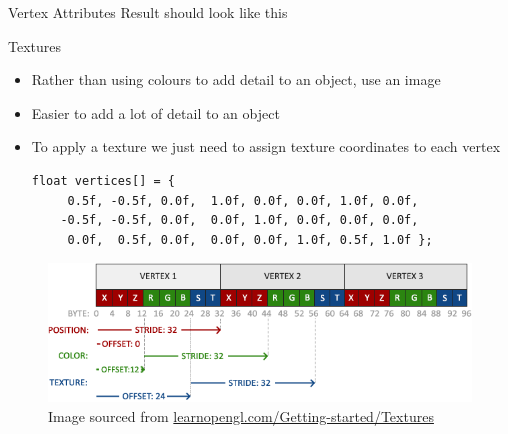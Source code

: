 \documentclass{beamer}
\begin{document}
\begin{frame}[fragile]{Vertex Attributes}
    Result should look like this
    \begin{center}
    \end{center}
\end{frame}

\begin{frame}[fragile]{Textures}
    \begin{itemize}
        \item Rather than using colours to add detail to an object, use an image
        \item Easier to add a lot of detail to an object
        \item To apply a texture we just need to assign texture coordinates to each vertex
              \footnotesize{
                  \begin{verbatim}
float vertices[] = {
     0.5f, -0.5f, 0.0f,  1.0f, 0.0f, 0.0f, 1.0f, 0.0f,
    -0.5f, -0.5f, 0.0f,  0.0f, 1.0f, 0.0f, 0.0f, 0.0f,
     0.0f,  0.5f, 0.0f,  0.0f, 0.0f, 1.0f, 0.5f, 1.0f };
\end{verbatim}
              }
    \end{itemize}

    \begin{figure}
        \centering
        \includegraphics[width=0.90\linewidth,keepaspectratio=true]{images/vertex_attribute_pointer_interleaved_textures.png}
        \caption{\footnotesize{Image sourced from \url{learnopengl.com/Getting-started/Textures}}}
    \end{figure}

\end{frame}
\end{document}
